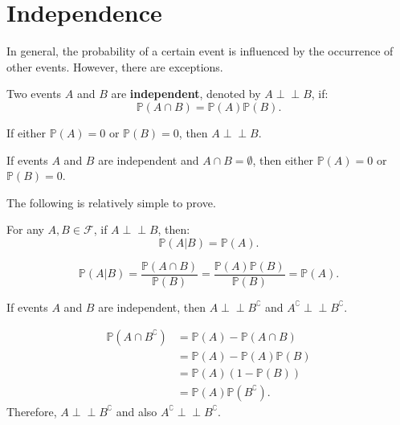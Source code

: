 \documentclass{huhtakm-template-book-v2}
\newcommand{\independent}{\perp\!\!\!\perp}
\newcommand{\prob}{\mathbb{P}}
\begin{document}
\section{Independence}
    In general, the probability of a certain event is influenced by the occurrence of other events. However, there are exceptions.
    \begin{defn}
        Two events $A$ and $B$ are \textbf{independent}, denoted by $A \independent B$, if:
        \begin{equation*}
            \prob(A\cap B) = \prob(A)\prob(B).
        \end{equation*}
    \end{defn}
    \begin{rem}
        If either $\prob(A) = 0$ or $\prob(B) = 0$, then $A \independent B$.
    \end{rem}
    \begin{rem}
        If events $A$ and $B$ are independent and $A\cap B = \emptyset$, then either $\prob(A) = 0$ or $\prob(B) = 0$.
    \end{rem}
    The following is relatively simple to prove.
    \begin{lem}
        For any $A,B \in \mathcal{F}$, if $A \independent B$, then:
        \begin{equation*}
            \prob(A|B) = \prob(A).
        \end{equation*}
    \end{lem}
    \begin{proofing}
        \begin{equation*}
            \prob(A|B) = \frac{\prob(A\cap B)}{\prob(B)} = \frac{\prob(A)\prob(B)}{\prob(B)} = \prob(A).
        \end{equation*}
    \end{proofing}
    \begin{prop}
        If events $A$ and $B$ are independent, then $A \independent B^{\complement}$ and $A^{\complement} \independent B^{\complement}$.
    \end{prop}
    \begin{proofing}
        \begin{align*}
            \prob(A\cap B^{\complement}) &= \prob(A)-\prob(A\cap B)\\
            &= \prob(A)-\prob(A)\prob(B)\\
            &= \prob(A)(1-\prob(B))\\
            &= \prob(A)\prob(B^{\complement}).
        \end{align*}
        Therefore, $A \independent B^{\complement}$ and also $A^{\complement} \independent B^{\complement}$.
    \end{proofing}
\end{document}
